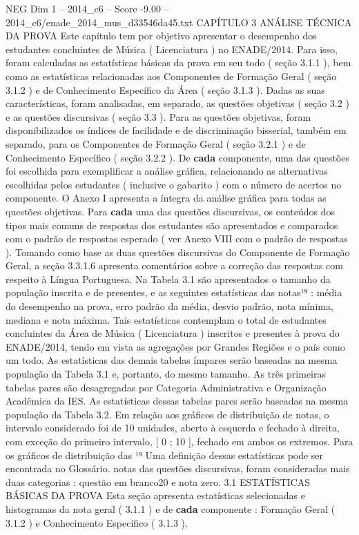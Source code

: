\begin{textsample}{NEG Dim 1 – 2014\_c6 – Score -9.00 – 2014\_c6/enade\_2014\_mus\_d33546da45.txt}  \label{ex:f1_neg_011}
CAPÍTULO 3 ANÁLISE TÉCNICA DA PROVA Este capítulo tem por objetivo apresentar o desempenho dos estudantes concluintes de Música ( Licenciatura ) no ENADE/2014.
Para isso, foram calculadas as estatísticas básicas da prova em seu todo ( seção 3.1.1 ), bem como as estatísticas relacionadas aos Componentes de Formação Geral ( seção 3.1.2 ) e de Conhecimento Específico da Área ( seção 3.1.3 ).
Dadas as suas características, foram analisadas, em separado, as questões objetivas ( seção 3.2 ) e as questões discursivas ( seção 3.3 ).
Para as questões objetivas, foram disponibilizados os índices de facilidade e de discriminação bisserial, também em separado, para os Componentes de Formação Geral ( seção 3.2.1 ) e de Conhecimento Específico ( seção 3.2.2 ).
De \textbf{cada} componente, uma das questões foi escolhida para exemplificar a análise gráfica, relacionando as alternativas escolhidas pelos estudantes ( inclusive o gabarito ) com o número de acertos no componente.
O Anexo I apresenta a íntegra da análise gráfica para todas as questões objetivas.
Para \textbf{cada} uma das questões discursivas, os conteúdos dos tipos mais comuns de respostas dos estudantes são apresentados e comparados com o padrão de respostas esperado ( ver Anexo VIII com o padrão de respostas ).
Tomando como base as duas questões discursivas do Componente de Formação Geral, a seção 3.3.1.6 apresenta comentários sobre a correção das respostas com respeito à Língua Portuguesa.
Na Tabela 3.1 são apresentados o tamanho da população inscrita e de presentes, e as seguintes estatísticas das notas¹⁹ : média do desempenho na prova, erro padrão da média, desvio padrão, nota mínima, mediana e nota máxima.
Tais estatísticas contemplam o total de estudantes concluintes da Área de Música ( Licenciatura ) inscritos e presentes à prova do ENADE/2014, tendo em vista as agregações por Grandes Regiões e o país como um todo.
As estatísticas das demais tabelas ímpares serão baseadas na mesma população da Tabela 3.1 e, portanto, do mesmo tamanho.
As três primeiras tabelas pares são desagregadas por Categoria Administrativa e Organização Acadêmica da IES.
As estatísticas dessas tabelas pares serão baseadas na mesma população da Tabela 3.2.
Em relação aos gráficos de distribuição de notas, o intervalo considerado foi de 10 unidades, aberto à esquerda e fechado à direita, com exceção do primeiro intervalo, [ 0 ; 10 ], fechado em ambos os extremos.
Para os gráficos de distribuição das ¹⁹ Uma definição dessas estatísticas pode ser encontrada no Glossário. notas das questões discursivas, foram consideradas mais duas categorias : questão em branco20 e nota zero. 3.1 ESTATÍSTICAS BÁSICAS DA PROVA Esta seção apresenta estatísticas selecionadas e histogramas da nota geral ( 3.1.1 ) e de \textbf{cada} componente : Formação Geral ( 3.1.2 ) e Conhecimento Específico ( 3.1.3 ).

\end{textsample}
